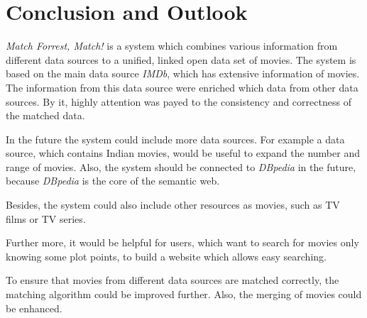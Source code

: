 \section{Conclusion and Outlook}
\label{sec_conclusion}

\emph{Match Forrest, Match!} is a system which combines various information from different data sources to a unified, linked open data set of movies.
The system is based on the main data source \textit{IMDb}, which has extensive information of movies.
The information from this data source were enriched which data from other data sources.
By it, highly attention was payed to the consistency and correctness of the matched data.

In the future the system could include more data sources.
For example a data source, which contains Indian movies, would be useful to expand the number and range of movies.
Also, the system should be connected to \textit{DBpedia} in the future, because \textit{DBpedia} is the core of the semantic web.

Besides, the system could also include other resources as movies, such as TV films or TV series.

Further more, it would be helpful for users, which want to search for movies only knowing some plot points, to build a website which allows easy searching.

To ensure that movies from different data sources are matched correctly, the matching algorithm could be improved further.
Also, the merging of movies could be enhanced.
